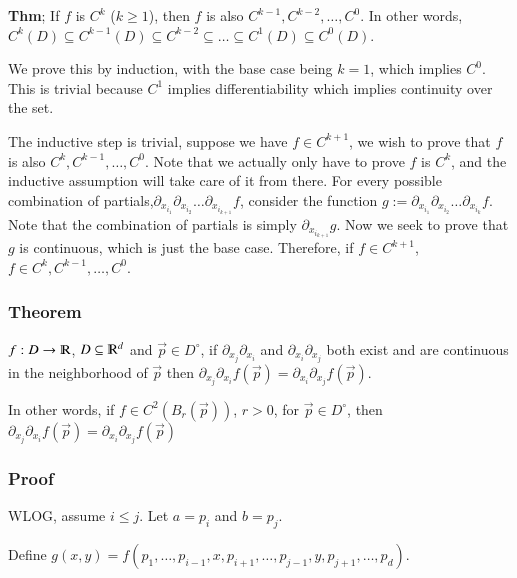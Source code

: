 \documentclass [12 pt, twoside] {book}
\newcommand\+{\text{ }}
\begin{document}
\textbf{Thm}; If $f$ is $C^k$ ($k \geq 1$), then $f$ is also $C^{k-1}, C^{k-2},
\dots, C^0$. In other words, $C^k(D) \subseteq C^{k-1}(D) \subseteq C^{k-2}
\subseteq \dots \subseteq C^1(D) \subseteq C^0(D)$.

We prove this by induction, with the base case being $k = 1$, which implies
$C^0$. This is trivial because $C^1$ implies differentiability which implies
continuity over the set.

The inductive step is trivial, suppose we have $f \in C^{k+1}$, we wish to prove
that $f$ is also $C^{k}, C^{k-1}, \dots, C^0$. Note that we actually only have
to prove $f$ is $C^k$, and the inductive assumption will take care of it from
there. For every possible combination of
partials,$\partial_{x_{i_1}}\partial_{x_{i_2}}\dots\partial_{x_{i_{k+1}} }f$,
consider the function $g :=
\partial_{x_{i_1}}\partial_{x_{i_2}}\dots\partial_{x_{i_k}}f$. Note that the
combination of partials is simply $\partial_{x_{i_{k+1} }}g$. Now we seek to
prove that $g$ is continuous, which is just the base case. Therefore, if $f \in
C^{k+1}$, $f \in C^k, C^{k-1}, \dots, C^0$.

\subsubsection{Theorem}
$f: D \to \varmathbb{R}$, $D \subseteq \varmathbb{R}^d$ and $\vec{p} \in D^\circ$, if
$\partial_{x_j}\partial_{x_i}$ and $\partial_{x_i}\partial_{x_j}$ both exist and
are continuous in the neighborhood of $\vec{p}$ then $\partial_{x_j}\partial_{x_i} f(\vec{p}) =
\partial_{x_i}\partial_{x_j} f(\vec{p})$.

In other words, if $f \in C^2(B_r(\vec{p}))$, $r > 0$, for $\vec{p} \in D^\circ$, then
$\partial_{x_j}\partial_{x_i} f(\vec{p}) = \partial_{x_i}\partial_{x_j}
f(\vec{p})$

\subsubsection{Proof}
WLOG, assume $i \leq j$. Let $a = p_i$ and $b = p_j$.

Define $g(x, y) = f(p_1, \dots, p_{i-1}, x, p_{i+1}, \dots, p_{j-1}, y, p_{j+1},
\dots, p_d)$.

%
%
\end{document}
